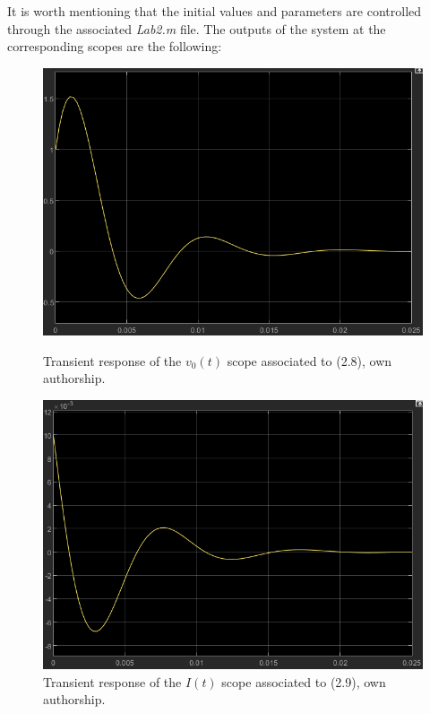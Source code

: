 \documentclass[a4paper,12pt]{article}
\begin{document}
It is worth mentioning that the initial values and parameters are controlled through the associated \textit{Lab2.m} file. The outputs of the system at the corresponding scopes are the following:

\vspace{0.5cm}

\begin{figure}[H]
    \centering
    \begin{minipage}[b]{0.4\linewidth}
        \centering
        \includegraphics[width=\linewidth]{scopev.png}
        \caption{Transient response of the $v_0(t)$ scope associated to (2.8), own authorship.}
        \label{fig:scopev}
    \end{minipage}
    \hspace{0.05\linewidth} %
    \begin{minipage}[b]{0.4\linewidth}
        \centering
        \includegraphics[width=\linewidth]{scopei.png}
        \caption{Transient response of the $I(t)$ scope associated to (2.9), own authorship.}
        \label{fig:scopei}
    \end{minipage}
\end{figure}
\end{document}
